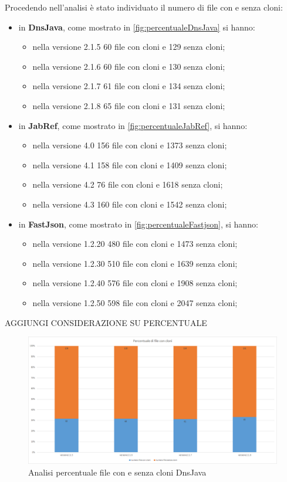 Procedendo nell'analisi è stato individuato il numero di file con e senza cloni:
\begin{itemize}
	\item in \textbf{DnsJava}, come mostrato in \autoref{fig:percentualeDnsJava} si hanno:
	\begin{itemize}
		\item nella versione 2.1.5 60 file con cloni e 129 senza cloni;
		\item nella versione 2.1.6 60 file con cloni e 130 senza cloni;
		\item nella versione 2.1.7 61 file con cloni e 134 senza cloni;
		\item nella versione 2.1.8 65 file con cloni e 131 senza cloni;
	\end{itemize}
	\item in \textbf{JabRef}, come mostrato in \autoref{fig:percentualeJabRef}, si hanno:
	\begin{itemize}
		\item nella versione 4.0 156 file con cloni e 1373 senza cloni;
		\item nella versione 4.1 158 file con cloni e 1409 senza cloni;
		\item nella versione 4.2 76 file con cloni e 1618 senza cloni;
		\item nella versione 4.3 160 file con cloni e 1542 senza cloni;
	\end{itemize}
		\item in \textbf{FastJson}, come mostrato in \autoref{fig:percentualeFastjson}, si hanno:
	\begin{itemize}
		\item nella versione 1.2.20 480 file con cloni e 1473 senza cloni;
		\item nella versione 1.2.30 510 file con cloni e 1639 senza cloni;
		\item nella versione 1.2.40 576 file con cloni e 1908 senza cloni;
		\item nella versione 1.2.50 598 file con cloni e 2047 senza cloni;
	\end{itemize}
\end{itemize}
AGGIUNGI CONSIDERAZIONE SU PERCENTUALE
\begin{figure}[h]
	\centering
	\includegraphics[scale=0.3, trim = 0cm 0cm 0cm 0cm, clip=true]{Grafici_dnsJava/PercentualeFileCloni.png}
	\caption{Analisi percentuale file con e senza cloni DnsJava}
	\label{fig:percentualeDnsJava}	
\end{figure}
